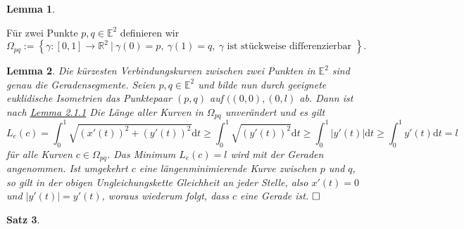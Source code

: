 \documentclass[11pt]{book}
\numberwithin{dummy}{section}
\newtheorem{theorem}{Satz}[section]
\newtheorem{lemma}[theorem]{Lemma}
\theoremstyle{nonumberbreak}
\newenvironment{defin}[1][]{\ifthenelse{\equal{#1}{}}{\definition}{\definition[#1]}\rm}{\enddefinition}
\newenvironment{pr}[1][]{\ifthenelse{\equal{#1}{}}{\proof}{\proof[#1]}\rm}{\endproof}
\newcommand{\R}{\mathbb{R}}
\newcommand{\la}{\longrightarrow}
\begin{document}
\begin{spacing}{1.4}
\begin{lemma}
\end{lemma}


\begin{defin}
Für zwei Punkte $p,q \in \mathbb{E}^2$ definieren wir
$$\Omega_{pq} := \left\{ \gamma: [0,1] \la \R^2 \ \vert \ \gamma(0)=p, \ \gamma(1) = q, \ \gamma \textrm{ ist stückweise differenzierbar } \right\}.$$


\end{defin}



\hypertarget{lemmazweieinsdrei}{}
\begin{lemma} %
Die kürzesten Verbindungskurven zwischen zwei Punkten in $\mathbb{E}^2$ sind genau die Geradensegmente.
\begin{pr}
Seien $p,q \in \mathbb{E}^2$ und bilde nun durch geeignete euklidische Isometrien das Punktepaar $(p,q)$ auf $((0,0), (0,l)$ ab. Dann ist nach \hyperlink{lemmazweieinseins}{Lemma 2.1.1} Die Länge aller Kurven in $\Omega_{pq}$ unverändert und es gilt
$$L_e(c) = \int_0^1 \sqrt{ (x'(t))^2 + (y'(t))^2} \mathrm{d}t \geqslant \int_0^1 \sqrt{(y'(t))^2} \mathrm{d}t \geqslant \int_0^1 \vert y'(t) \vert \mathrm{d} t \geqslant \int_0^1 y'(t) \mathrm{d}t = l$$
für alle Kurven $c \in \Omega_{pq}$. Das Minimum $L_e(c)=l$ wird mit der Geraden angenommen. Ist umgekehrt $c$ eine längenminimierende Kurve zwischen $p$ und $q$, so gilt in der obigen Ungleichungskette Gleichheit an jeder Stelle, also $x'(t)=0$ und $\vert y'(t)\vert = y'(t)$, woraus wiederum folgt, dass $c$ eine Gerade ist. $\hfill \Box$


\end{pr}
\end{lemma}


\begin{theorem}    %


\end{theorem}
\end{spacing}
\end{document}
